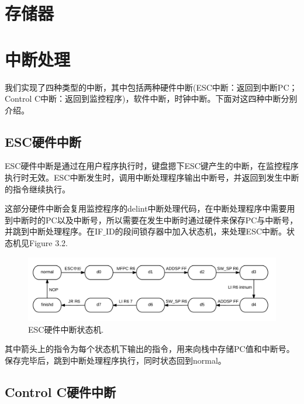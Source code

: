 
\section{存储器}


\section{中断处理}

我们实现了四种类型的中断，其中包括两种硬件中断(ESC中断：返回到中断PC；Control C中断：返回到监控程序)，软件中断，时钟中断。下面对这四种中断分别介绍。

\subsection{ESC硬件中断}

ESC硬件中断是通过在用户程序执行时，键盘摁下ESC键产生的中断，在监控程序执行时无效。ESC中断发生时，调用中断处理程序输出中断号，并返回到发生中断的指令继续执行。

这部分硬件中断会复用监控程序的delint中断处理代码，在中断处理程序中需要用到中断时的PC以及中断号，所以需要在发生中断时通过硬件来保存PC与中断号，并跳到中断处理程序。在IF$\_$ID的段间锁存器中加入状态机，来处理ESC中断。状态机见Figure 3.2.

\begin{figure}[H]
  \includegraphics[width=\linewidth]{Figures/escint.png}
  \caption{ESC硬件中断状态机.}
\end{figure}

其中箭头上的指令为每个状态机下输出的指令，用来向栈中存储PC值和中断号。保存完毕后，跳到中断处理程序执行，同时状态回到normal。

\subsection{Control C硬件中断}

